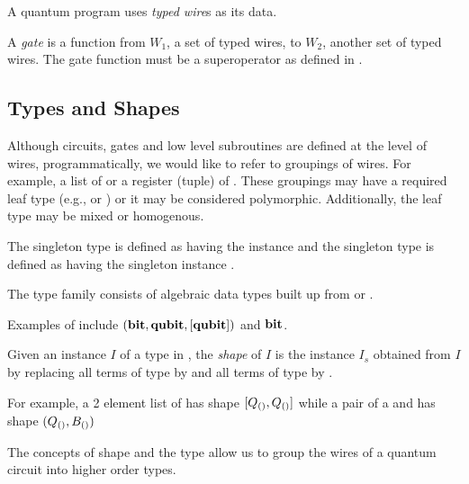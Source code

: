 A quantum program uses \emph{typed wire}s as its data.

\begin{definition}\label{def:gate}
  A \emph{gate} is a function from $W_1$, a set of typed wires, to $W_2$, another set of typed
  wires. The gate function must be a superoperator as defined in \cite{selinger04:qpl}.
\end{definition}

\subsection{Types and Shapes} %
\label{sub:types_and_shapes}
Although circuits, gates and low level subroutines are defined at the level of wires,
programmatically, we would like to refer to groupings of wires. For example, a list of \qubit or a
register (tuple) of \qubit. These groupings may have a required leaf type (e.g., \qubit or \bit) or
it may be considered polymorphic. Additionally, the leaf type may be mixed or homogenous.


\begin{definition}\label{def:singletons}
  The singleton type  is defined as having the instance \Bs and the singleton type 
  is defined as having the singleton instance \Qs.
\end{definition}

\begin{definition}\label{def:qcdata}
  The type family  consists of algebraic data types built up from \bit or \qubit.
\end{definition}

Examples of  include $(\mathbf{{bit}},\mathbf{{qubit}},[\mathbf{{qubit}}])$ and $\mathbf{{bit}}$.

\begin{definition}\label{def:shape}
  Given an instance $I$ of a type  in , the \emph{shape} of $I$ is the
  instance $I_s$ obtained from $I$ by replacing all terms of type \bit by \Bs and all terms of type
  \qubit by \Qs.
\end{definition}

For example, a 2 element list of \qubits has shape $[Q_{()},Q_{()}]$ while a pair of a \qubit and \bit
has shape $(Q_{()},B_{()})$


The concepts of shape and the type  allow us to group the wires of a quantum circuit
into higher order types.

